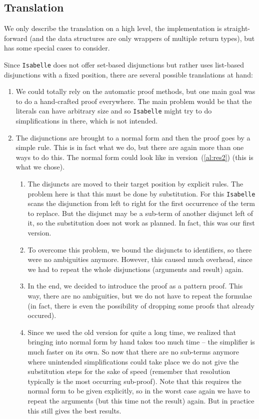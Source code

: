 \documentclass[10pt,a4paper]{article}
\newcommand{\isa}{\texttt{Isabelle}\xspace}
\begin{document}
\subsection*{Translation}
We only describe the translation on a high level, the implementation is straight-forward (and the data structures are only wrappers of multiple return types), but has some special cases to consider.

Since \isa does not offer set-based disjunctions but rather uses list-based disjunctions with a fixed position, there are several possible translations at hand:
%
\begin{enumerate}
	\item We could totally rely on the automatic proof methods, but one main goal was to do a hand-crafted proof everywhere. The main problem would be that the literals can have arbitrary size and so \isa might try to do simplifications in there, which is not intended.
	\item The disjunctions are brought to a normal form and then the proof goes by a simple rule. This is in fact what we do, but there are again more than one ways to do this. The normal form could look like in version~(\ref{al:res2}) (this is what we chose).
	\begin{enumerate}
		\item The disjuncts are moved to their target position by explicit rules. The problem here is that this must be done by substitution. For this \isa scans the disjunction from left to right for the first occurrence of the term to replace. But the disjunct may be a sub-term of another disjunct left of it, so the substitution does not work as planned. In fact, this was our first version.
		\item To overcome this problem, we bound the disjuncts to identifiers, so there were no ambiguities anymore. However, this caused much overhead, since we had to repeat the whole disjunctions (arguments and result) again.
		\item In the end, we decided to introduce the proof as a pattern proof. This way, there are no ambiguities, but we do not have to repeat the formulae (in fact, there is even the possibility of dropping some proofs that already occured).
		\item Since we used the old version for quite a long time, we realized that bringing into normal form by hand takes too much time -- the simplifier is much faster on its own. So now that there are no sub-terms anymore where unintended simplifications could take place we do not give the substitution steps for the sake of speed (remember that resolution typically is the most occurring sub-proof). Note that this requires the normal form to be given explicitly, so in the worst case again we have to repeat the arguments (but this time not the result) again. But in practice this still gives the best results.
	\end{enumerate}
\end{enumerate}
\end{document}
